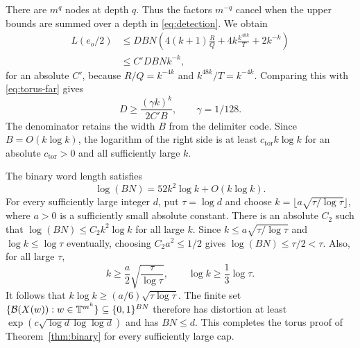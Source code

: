 There are $m^q$ nodes at depth $q$. Thus the factors $m^{-q}$ cancel
when the upper bounds are summed over a depth in
\eqref{eq:detection}. We obtain
\begin{align*}
 L(e_o/2)
 &\leq DBN\left(
 4(k+1)\frac RQ+4k\frac{k^{48k}}T+2k^{-k}\right)\\
 &\leq C'DBNk^{-k},
\end{align*}
for an absolute $C'$, because $R/Q=k^{-4k}$ and
$k^{48k}/T=k^{-4k}$. Comparing this with \eqref{eq:torus-far} gives
\begin{equation}\label{eq:torus-final-D}
 D\geq\frac{(\gamma k)^k}{2C'B},
 \qquad\gamma=1/128.
\end{equation}
The denominator retains the width $B$ from the delimiter code.
Since $B=O(k\log k)$, the logarithm of the right side is at least
$c_{\mathrm{tor}}k\log k$ for an absolute $c_{\mathrm{tor}}>0$ and all
sufficiently large $k$.

The binary word length satisfies
\begin{equation}\label{eq:torus-log-length}
 \log(BN)=52k^2\log k+O(k\log k).
\end{equation}
For every sufficiently large integer $d$, put $\tau=\log d$ and choose
$k=\lfloor a\sqrt{\tau/\log\tau}\rfloor$, where $a>0$ is a sufficiently
small absolute constant. There is an absolute $C_2$ such that
$\log(BN)\leq C_2k^2\log k$ for all large $k$. Since
$k\leq a\sqrt{\tau/\log\tau}$ and $\log k\leq\log\tau$ eventually, choosing
$C_2a^2\leq1/2$ gives $\log(BN)\leq\tau/2<\tau$.
Also, for all large $\tau$,
\[
 k\geq\frac a2\sqrt{\frac \tau{\log\tau}},
 \qquad \log k\geq\frac13\log\tau.
\]
It follows that $k\log k\geq(a/6)\sqrt{\tau\log\tau}$.
The finite set
$\{\mathcal B(X(w)):w\in\mathbb T^{m^k}\}\subseteq\{0,1\}^{BN}$ therefore
has distortion at least
$\exp(c\sqrt{\log d\,\log\log d})$ and has $BN\leq d$.
This completes the torus proof of Theorem~\ref{thm:binary} for every
sufficiently large cap.
